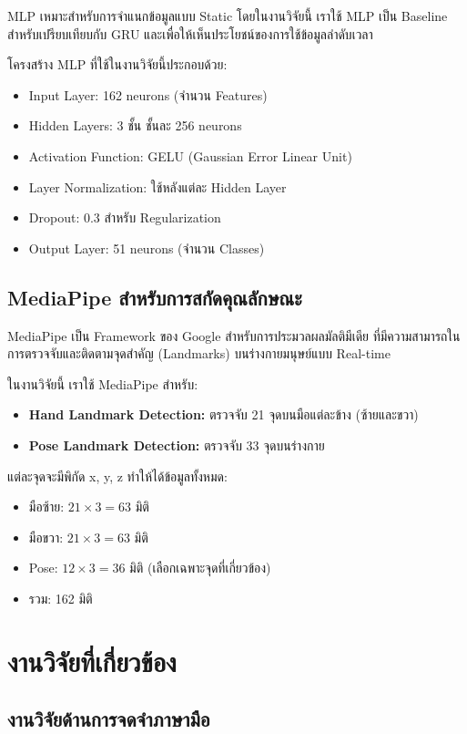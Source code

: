 \documentclass[12pt,a4paper]{report}
\begin{document}
MLP เหมาะสำหรับการจำแนกข้อมูลแบบ Static โดยในงานวิจัยนี้ เราใช้ MLP เป็น Baseline 
สำหรับเปรียบเทียบกับ GRU และเพื่อให้เห็นประโยชน์ของการใช้ข้อมูลลำดับเวลา

โครงสร้าง MLP ที่ใช้ในงานวิจัยนี้ประกอบด้วย:
\begin{itemize}
    \item Input Layer: 162 neurons (จำนวน Features)
    \item Hidden Layers: 3 ชั้น ชั้นละ 256 neurons
    \item Activation Function: GELU (Gaussian Error Linear Unit)
    \item Layer Normalization: ใช้หลังแต่ละ Hidden Layer
    \item Dropout: 0.3 สำหรับ Regularization
    \item Output Layer: 51 neurons (จำนวน Classes)
\end{itemize}

\subsection{MediaPipe สำหรับการสกัดคุณลักษณะ}

MediaPipe เป็น Framework ของ Google สำหรับการประมวลผลมัลติมีเดีย 
ที่มีความสามารถในการตรวจจับและติดตามจุดสำคัญ (Landmarks) บนร่างกายมนุษย์แบบ Real-time

ในงานวิจัยนี้ เราใช้ MediaPipe สำหรับ:
\begin{itemize}
    \item \textbf{Hand Landmark Detection:} ตรวจจับ 21 จุดบนมือแต่ละข้าง (ซ้ายและขวา)
    \item \textbf{Pose Landmark Detection:} ตรวจจับ 33 จุดบนร่างกาย
\end{itemize}

แต่ละจุดจะมีพิกัด x, y, z ทำให้ได้ข้อมูลทั้งหมด:
\begin{itemize}
    \item มือซ้าย: $21 \times 3 = 63$ มิติ
    \item มือขวา: $21 \times 3 = 63$ มิติ
    \item Pose: $12 \times 3 = 36$ มิติ (เลือกเฉพาะจุดที่เกี่ยวข้อง)
    \item รวม: 162 มิติ
\end{itemize}

\section{งานวิจัยที่เกี่ยวข้อง}

\subsection{งานวิจัยด้านการจดจำภาษามือ}
\end{document}
